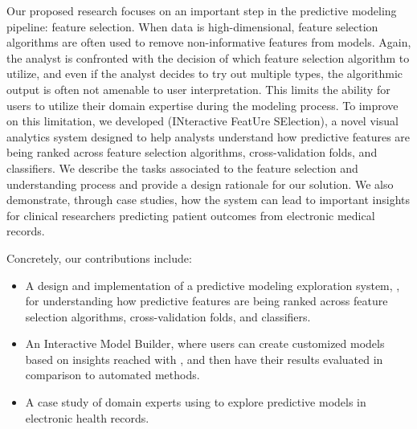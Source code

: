 Our proposed research focuses on an important step in the predictive modeling pipeline: feature selection. When data is high-dimensional, feature selection algorithms are often used to remove non-informative features from models. Again, the analyst is confronted with the decision of which feature selection algorithm to utilize, and even if the analyst decides to try out multiple types, the algorithmic output is often not amenable to user interpretation. This limits the ability for users to utilize their domain expertise during the modeling process. To improve on this limitation, we developed \infuse (INteractive FeatUre SElection), a novel visual analytics system designed to help analysts understand how predictive features are being ranked across feature selection algorithms, cross-validation folds, and classifiers. We describe the tasks associated to the feature selection and understanding process and provide a design rationale for our solution. We also demonstrate, through case studies, how the system can lead to important insights for clinical researchers predicting patient outcomes from electronic medical records.

Concretely, our contributions include:

\begin{itemize}
\item A design and implementation of a predictive modeling exploration system,
\infuse, for understanding how predictive features are being ranked
across feature selection algorithms, cross-validation folds, and classifiers.
\item An Interactive Model Builder, where users can create customized models based on insights reached with \infuse, and then have their results evaluated in comparison to automated methods.
\item A case study of domain experts using
\infuse  to explore predictive models in electronic health records.
\end{itemize}

